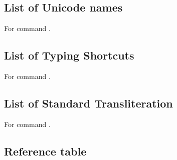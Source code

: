 \subsection{List of Unicode names}
For command \codedetok{\avtransun{}}.
\begin{multicols}{4}\noindent
\avtag
\avshowplainlistun
\eolist
\end{multicols}

\subsection{List of Typing Shortcuts}
For command \codedetok{\avtransts{}}.
\begin{multicols}{4}\noindent
\avtag
\avshowplainlistts
\eolist
\end{multicols}

\subsection{List of Standard Transliteration}
For command \codedetok{\avtransst{}}.
\begin{multicols}{4}\noindent
\avtag
\avshowplainlistst
\eolist
\end{multicols}

\subsection{Reference table}

